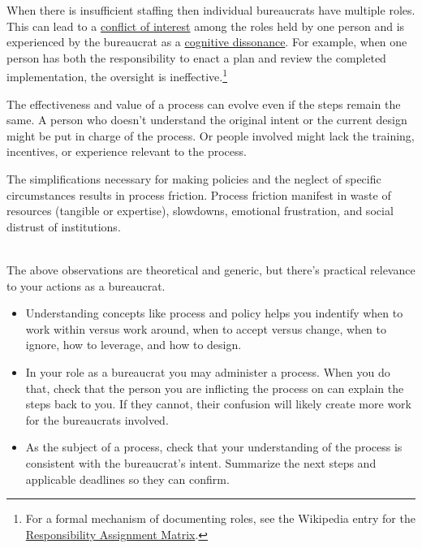 When there is insufficient staffing then individual bureaucrats have multiple roles. This can lead to a 
\href{https://en.wikipedia.org/wiki/Conflict_of_interest}{conflict of interest}  
among the roles held by one person and is experienced by the bureaucrat as a \href{https://en.wikipedia.org/wiki/Cognitive_dissonance}{cognitive dissonance}. 
For example, when one person has both the responsibility to enact a plan and review the completed implementation, the oversight is ineffective.\footnote{For a formal mechanism of documenting roles, see the Wikipedia entry for the 
\href{https://en.wikipedia.org/wiki/Responsibility_assignment_matrix}{Responsibility Assignment Matrix}.
}

The effectiveness and value of a process can evolve even if the steps remain the same. 
A person who doesn't understand the original intent or the current design might be put in charge of the process. Or people involved might lack the training, incentives, or experience relevant to the process. 


The simplifications necessary for making policies and the neglect of specific circumstances results in \gls{process friction}. Process friction manifest in waste of resources (tangible or expertise), slowdowns, emotional frustration, and social distrust of institutions.

\ \\

The above observations are theoretical and generic, but there's practical relevance to your actions as a bureaucrat.
\begin{itemize}
    \item Understanding concepts like process and policy helps you indentify when to work within versus work around, when to accept versus change, when to ignore, how to leverage, and how to design.
    \item In your role as a bureaucrat you may administer a process. When you do that, check that the person you are inflicting the process on can explain the steps back to you. If they cannot, their confusion will likely create more work for the bureaucrats involved. 
%
    \item As the subject of a process, check that your understanding of the process is consistent with the bureaucrat's intent. Summarize the next steps and applicable deadlines so they can confirm. 
\end{itemize}


